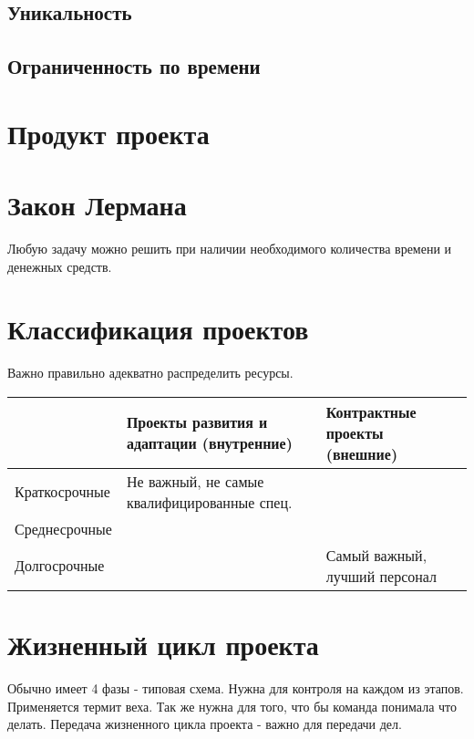 \subsection{Уникальность}
\subsection{Ограниченность по времени}

\section{Продукт проекта}

\section{Закон Лермана}
Любую задачу можно решить при наличии необходимого количества времени и денежных средств.

\section{Классификация проектов}

Важно правильно адекватно распределить ресурсы.

\begin{table}[h!]
\begin{tabular}{|l|l|l|}
\hline
              & Проекты развития и адаптации (внутренние)   & Контрактные проекты (внешние) \\ \hline
Краткосрочные & Не важный, не самые квалифицированные спец. &                               \\ \hline
Среднесрочные &                                             &                               \\ \hline
Долгосрочные  &                                             & Самый важный, лучший персонал \\ \hline
\end{tabular}
\end{table}

\section{Жизненный цикл проекта}

Обычно имеет 4 фазы - типовая схема. Нужна для контроля на каждом из этапов. Применяется термит веха. Так же нужна для того, что бы команда понимала что делать. Передача жизненного цикла проекта - важно для передачи дел.

